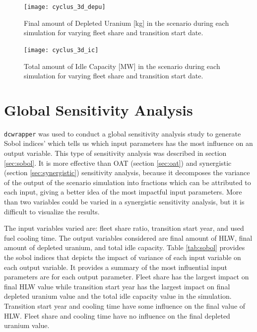 \begin{figure}[]
    \centering
    \texttt{[image: cyclus\_3d\_depu]} 
    \caption{Final amount of Depleted Uranium [kg] in the scenario during each simulation for varying fleet share and transition start date.}
    \label{fig:cyclus_3d_depu}
\end{figure}

\begin{figure}[]
    \centering
    \texttt{[image: cyclus\_3d\_ic]} 
    \caption{Total amount of Idle Capacity [MW] in the scenario during each simulation for varying fleet share and transition start date.}
    \label{fig:cyclus_3d_ic}
\end{figure}

\section{Global Sensitivity Analysis}
\texttt{dcwrapper} was used to conduct a global sensitivity 
analysis study to generate Sobol indices' which tells us which 
input parameters has the most influence on an output variable. 
This type of sensitivity analysis was described in 
section \ref{sec:sobol}. 
It is more effective than OAT (section \ref{sec:oat}) and 
synergistic (section \ref{sec:synergistic}) sensitivity 
analysis, because it decomposes the variance of the 
output of the scenario simulation into fractions which can be 
attributed to each input, giving a better idea of the
most impactful input parameters. 
More than two variables could be varied in a synergistic
sensitivity analysis, but it is difficult to visualize the 
results. 

The input variables varied are: fleet share ratio, 
transition start year, and used fuel cooling time.
The output variables considered are final amount of HLW, 
final amount of depleted uranium, and total idle capacity. 
Table \ref{tab:sobol} provides the sobol indices that depicts 
the impact of variance of each input variable on each output 
variable. 
It provides a summary of the most influential input parameters 
are for each output parameter. 
Fleet share has the largest impact on 
final HLW value while transition start year has the largest 
impact on final depleted uranium value and the total idle 
capacity value in the simulation. 
Transition start year and cooling time have some influence on 
the final value of HLW. 
Fleet share and cooling time have no influence on the final 
depleted uranium value. 
    
